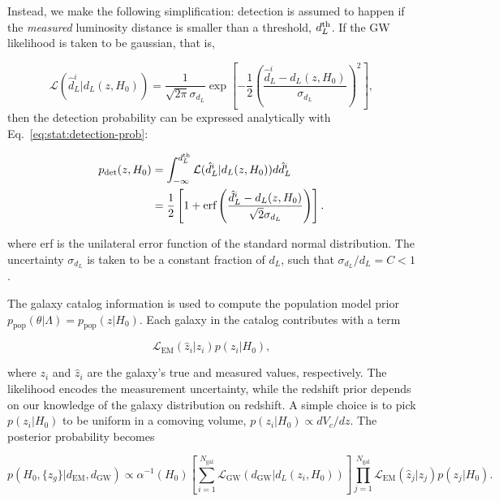 \documentclass[%
preprint,
nofootinbib,
 amsmath,amssymb,
 aps,
]{revtex4-2}
\newcommand{\given}[2]{p( #1 | #2 )}
\newcommand{\ppop}[0]{p_{\text{pop}}}
\newcommand{\pdet}[0]{p_{\text{det}}}
\begin{document}
Instead, we make the following simplification: detection is assumed to happen if the
\textit{measured} luminosity distance is smaller than a threshold, $d_L^{\rm{th}}$. If the GW
likelihood is taken to be gaussian, that is,

\begin{equation}
	\label{eq:stat:gw-gaussian-likelihood}
	\mathcal{L}(\hat{d}_L^i | d_L(z, H_0))
	= \frac{1}{\sqrt{2 \pi} \sigma_{d_L}} \exp{\left [-\frac{1}{2} \left (\frac{\hat{d}_L^i - d_L(z, H_0)}{\sigma_{d_L}} \right )^2 \right ]},
\end{equation}
then the detection probability can be expressed analytically with Eq.~\eqref{eq:stat:detection-prob}:

\begin{align}
	\nonumber
	\pdet(z, H_0) & = \int_{-\infty}^{d_L^{\rm{th}}} \mathcal{L}(\hat{d}_L^i | d_L(z, H_0)) d \hat{d}_L^i                                    \\
	              & = \frac{1}{2} \left [ 1 + \text{erf} \left (\frac{\hat{d}_L^i - d_L(z, H_0)}{ \sqrt{2} \sigma_{d_L}}  \right ) \right ].
\end{align}

where erf is the unilateral error function of the standard normal distribution. The uncertainty
$\sigma_{d_L}$ is taken to be a constant fraction of $d_L$, such that $\sigma_{d_L} / d_L = C < 1$.

The galaxy catalog information is used to compute the population model prior $\ppop(\theta |
	\Lambda) = \ppop(z | H_0)$. Each galaxy in the catalog contributes with a term

\begin{equation}
	\mathcal{L}_\text{EM}(\hat{z}_i | z_i)p(z_i | H_0),
\end{equation}

where $z_i$ and $\hat{z}_i$ are the galaxy's true and measured values, respectively. The likelihood
encodes the measurement uncertainty, while the redshift prior depends on our knowledge of the
galaxy distribution on redshift. A simple choice is to pick $p(z_i | H_0)$ to be uniform in a
comoving volume, $p(z_i | H_0) \propto dV_c /dz$. The posterior probability becomes

\begin{equation}
	\label{eq:stat:full-redshift-posterior}
	\given{H_0, \{z_g\}}{d_\text{EM}, d_\text{GW}} \propto
	\alpha^{-1}(H_0) \left [ \sum_{i=1}^{N_\text{gal}} \mathcal{L}_\text{GW}(d_\text{GW} | d_L(z_i, H_0)) \right ]
	\prod_{j=1}^{N_\text{gal}} \mathcal{L}_\text{EM}(\hat{z}_j | z_j)p(z_j | H_0).
\end{equation}
\end{document}
